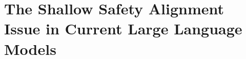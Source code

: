 
\vspace{-0.5em}
\section{The Shallow Safety Alignment Issue in Current Large Language Models}
\label{sec:shallow_alignment}
\vspace{-0.5em}








